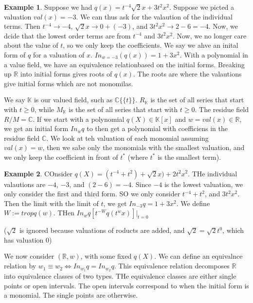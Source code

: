 \documentclass[11pt]{article}
\theoremstyle{definition}
\theoremstyle{plain}%
\theoremstyle{definition}
\newtheorem{protoexample}{Example}[section]
\newenvironment{ex}
   {\colorlet{shadecolor}{red!15}\begin{shaded}\begin{protoexample}}
   {\end{protoexample}\end{shaded}}
\def\RR{{\mathbb R}}
\def\KK{{\mathbb K}}
\def\CC{{\mathbb C}}
\begin{document}
\begin{ex}
    Suppose we had $q(x) = t^{-4} \sqrt{2} x + 3t^2x^2$. Suppose we picted a valuation $val(x) = -3$. We can thus ask for the valaution of the individual terms. Then $t^{-4} \rightarrow -4$, $\sqrt{2}x \rightarrow 0+(-3)$, and $3t^2 x^2 \rightarrow 2-6= -4$. Now, we dcide that the lowest order terms are from $t^{-4}$ and $3t^2x^2$. Now, we no longer care about the value of $t$, so we only keep the coefficients. We say we ahve an inital form of $q$ for a valuation of $x$. $In_{w = -3} (q(x)) = 1+ 3x^2$. With a polynomial in a value field, we have an equivalence relationbased on the initial forms. Breaking up $\RR$ into initial forms gives roots of $q(x)$. The roots are where the valautions give initial forms which are not monomilas.
\end{ex}


We say $\KK$ is our valued field, such as $\CC\{\{t\}\}$. $R_\KK$ is the set of all series that start with $t \geq 0$, while $M_\KK$ is the set of all series that start with $t \geq 0$. The residue field $R/M = \CC$. If we start with a polynomial $q(X) \in \KK[x]$ and $w= val(x) \in \RR$, we get an initial form $In_w q$ to then get a polynomial with coefficiens in the residue field $\CC$. We look at teh valuation of each monomial assuming $val(x)=w$, then we sabe only the monomials with the smallest valuation, and we only keep the coefficient in front of $t^*$ (where $t^*$ is the smallest term).

\begin{ex}
    COnsider $q(X) = (t^{-4} + t^2) + \sqrt{2} x) + 2t^2x^2 $. THe individual valautions are $-4$, $-3$, and $(2-6)=-4$. Since $-4$ is the lowest valuation, we only consider the first and third form. SO we only consider $t^{-4}+t^2$, and $3t^2x^2$. Then the limit with the limit of $t$,  we get $In_{-3} q = 1 + 3x^2$. We define $W:=trop q(w)$. THen $In_w q [t^{-W} q(t^wx)] |_{t=0}$
\end{ex}


($\sqrt{2}$ is ignored because valuations of roducts are added, and $\sqrt{2}=\sqrt{2}t^0$, which has valuation $0$)


We now consider $(\RR,w)$, with some fixed $q(X)$. We can define an equivalnce relation by $w_1 \equiv w_2 \iff In_{w_1}q = In_{w_2}q$. This equivalence relation decomposes $\RR$ into equivalence classes of two types. THe equivalence classes are either single points or open intervals. The open intervals correspond to when the initial form is a monomial. The single points are otherwise.
\end{document}
